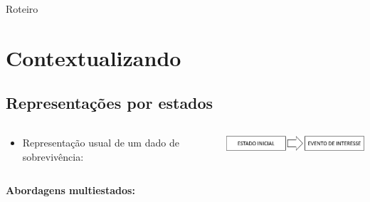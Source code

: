\begin{frame}{Roteiro}

\tableofcontents

\end{frame}

\section{Contextualizando}\label{contextualizando}

\subsection{Representações por
estados}\label{representacoes-por-estados}

\begin{frame}

\begin{itemize}
 \pause \item
  \begin{columns}
   \begin{column}{.4\textwidth}
    \begin{center}
     Representação usual de um dado de sobrevivência:
    \end{center}
   \end{column}
   \begin{column}{.6\textwidth}
    \begin{center}
     \includegraphics*[height = .75cm, width = 6cm]{surv.png}
    \end{center}
   \end{column}
  \end{columns}
\end{itemize}

\vspace{.5cm}

\pause \textbf{Abordagens multiestados:}


\end{frame}
